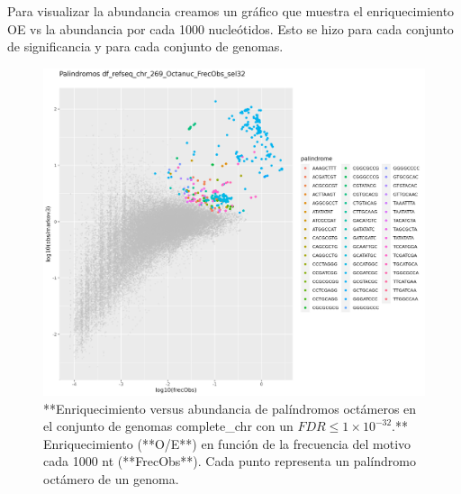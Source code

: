 \documentclass[
]{book}
\begin{document}
Para visualizar la abundancia creamos un gráfico que muestra el enriquecimiento OE vs la abundancia por cada 1000 nucleótidos. Esto se hizo para cada conjunto de significancia y para cada conjunto de genomas.

\begin{figure}

{\centering \includegraphics[width=0.8\linewidth]{figures/df_refseq_chr_269_Octanuc_FrecObs_sel32_significative-palindromes} 

}

\caption{**Enriquecimiento versus abundancia de palíndromos octámeros en el conjunto de genomas complete\_chr con un $FDR \leq 1 \times 10^{-32}$.** Enriquecimiento (**O/E**) en función de la frecuencia del motivo cada 1000 nt (**FrecObs**). Cada punto representa un palíndromo octámero de un genoma.}\label{fig:FIG1}
\end{figure}
\end{document}
